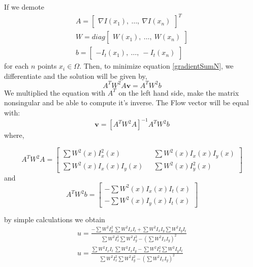 \documentclass[12pt,a4paper,twoside]{report}
\begin{document}
If we demote
\begin{equation}
\begin{split}
A = \begin{bmatrix}
\nabla I(x_1), \ \dots , \ \nabla I(x_n)
\end{bmatrix} ^T \\
W = diag
\begin{bmatrix}
W(x_1), \ \dots , \ W(x_n)
\end{bmatrix}
\\
b = 
\begin{bmatrix}
-I_t(x_1), \ \dots, \ -I_t(x_n) 
\end{bmatrix}
\end{split}
\end{equation}
for each $n$ points $x_i \in \Omega$. Then, to minimize equation \ref{gradientSumN}, we differentiate  and the solution will be given by,
\begin{equation}
	A^T W^2 A  \boldsymbol{v} = A^T W^2 b 
\end{equation}
We multiplied the equation with $A^T$ on the left hand side, make the matrix nonsingular and be able to compute it's inverse. The Flow vector will be equal with:
\begin{equation}
\boldsymbol{v} = [A^T W^2 A  ]^{-1}A^T W^2 b
\end{equation}
where,

\begin{equation}
A^T W^2 A = 
\begin{bmatrix}
\sum W^2(x)I_x^2(x) \ \ \  
&\sum W^2(x)I_x(x) I_y(x) \\
\sum W^2(x)I_x(x) I_y(x) \ \ \  
&\sum W^2(x)I_y^2(x) 
\end{bmatrix}
\end{equation}
and
\begin{equation}
A^T W^2 b = 
\begin{bmatrix}
-\sum W^2(x)I_x(x)I_t(x)   \\
-\sum W^2(x)I_y(x) I_t(x)  

\end{bmatrix}
\end{equation}
 
by simple calculations we obtain
\begin{equation}
\begin{split}
	u =\frac{-\sum W^2I_y^2\ \sum W^2I_xI_t 
		+ \sum W^2I_x I_y  \sum W^2I_yI_t }
	{\sum W^2 I_x^2 \sum W^2 I_y^2
		- (\sum W^2 I_x I_y)^2 } \\
	u =\frac{\sum W^2I_x I_t\ \sum W^2I_xI_y 
		 - \sum W^2I_x^2  \sum W^2I_yI_t }
	{\sum W^2 I_x^2 \sum W^2 I_y^2
		- (\sum W^2 I_x I_y)^2 } \\
\end{split}
\end{equation}
\end{document}

